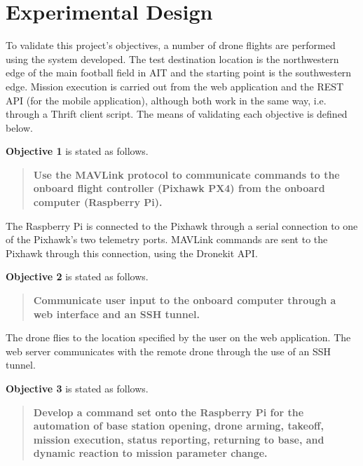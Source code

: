 \newpage
\section{Experimental Design}\label{sect:experimentaldesign}
To validate this project's objectives, a number of drone flights are performed using the system developed. The test destination location is the northwestern edge of the main football field in AIT and the starting point is the southwestern edge. Mission execution is carried out from the web application and the REST API (for the mobile application), although both work in the same way, i.e. through a Thrift client script. The means of validating each objective is defined below.

\textbf{Objective 1} is stated as follows.
\begin{quote}
    \textbf{Use the MAVLink protocol to communicate commands to the  onboard flight controller (Pixhawk PX4) from the onboard computer (Raspberry Pi).}
\end{quote}

The Raspberry Pi is connected to the Pixhawk through a serial connection to one of the Pixhawk's two telemetry ports. MAVLink commands are sent to the Pixhawk through this connection, using the Dronekit API.

\textbf{Objective 2} is stated as follows.
\begin{quote}
    \textbf{Communicate user input to the onboard computer through a web interface and an SSH tunnel.}
\end{quote}

The drone flies to the location specified by the user on the web application. The web server communicates with the remote drone through the use of an SSH tunnel.

\textbf{Objective 3} is stated as follows.
\begin{quote}
    \textbf{Develop a command set onto the Raspberry Pi for the automation of base station opening, drone arming, takeoff, mission execution, status reporting, returning to base, and dynamic reaction to mission parameter change.}
\end{quote}

